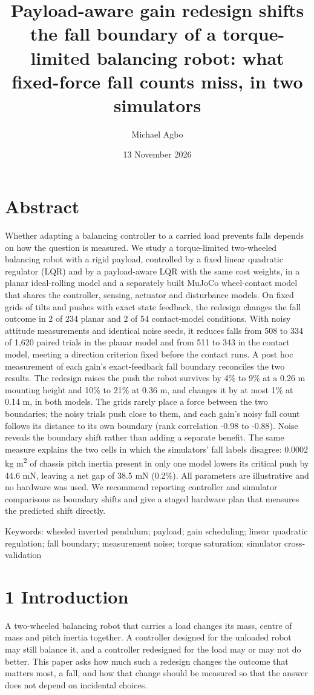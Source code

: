\documentclass[11pt,a4paper]{article}
\title{Payload-aware gain redesign shifts the fall boundary of a torque-limited balancing robot: what fixed-force fall counts miss, in two simulators}
\author{Michael Agbo}
\date{13 November 2026}
\begin{document}
\maketitle
\section*{Abstract}
Whether adapting a balancing controller to a carried load prevents falls depends on how the question is measured. We study a torque-limited two-wheeled balancing robot with a rigid payload, controlled by a fixed linear quadratic regulator (LQR) and by a payload-aware LQR with the same cost weights, in a planar ideal-rolling model and a separately built MuJoCo wheel-contact model that shares the controller, sensing, actuator and disturbance models. On fixed grids of tilts and pushes with exact state feedback, the redesign changes the fall outcome in 2 of 234 planar and 2 of 54 contact-model conditions. With noisy attitude measurements and identical noise seeds, it reduces falls from 508 to 334 of 1,620 paired trials in the planar model and from 511 to 343 in the contact model, meeting a direction criterion fixed before the contact runs. A post hoc measurement of each gain's exact-feedback fall boundary reconciles the two results. The redesign raises the push the robot survives by 4\% to 9\% at a 0.26 m mounting height and 10\% to 21\% at 0.36 m, and changes it by at most 1\% at 0.14 m, in both models. The grids rarely place a force between the two boundaries; the noisy trials push close to them, and each gain's noisy fall count follows its distance to its own boundary (rank correlation -0.98 to -0.88). Noise reveals the boundary shift rather than adding a separate benefit. The same measure explains the two cells in which the simulators' fall labels disagree: 0.0002 kg m\textsuperscript{2} of chassis pitch inertia present in only one model lowers its critical push by 44.6 mN, leaving a net gap of 38.5 mN (0.2\%). All parameters are illustrative and no hardware was used. We recommend reporting controller and simulator comparisons as boundary shifts and give a staged hardware plan that measures the predicted shift directly.

Keywords: wheeled inverted pendulum; payload; gain scheduling; linear quadratic regulation; fall boundary; measurement noise; torque saturation; simulator cross-validation

\section*{1 Introduction}
A two-wheeled balancing robot that carries a load changes its mass, centre of mass and pitch inertia together. A controller designed for the unloaded robot may still balance it, and a controller redesigned for the load may or may not do better. This paper asks how much such a redesign changes the outcome that matters most, a fall, and how that change should be measured so that the answer does not depend on incidental choices.
\end{document}
